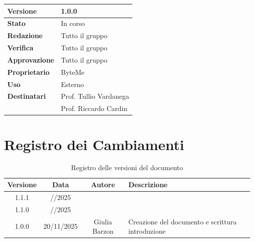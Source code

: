 \documentclass[11pt,a4paper]{article}
\begin{document}
\begin{titlepage}
    \begin{table}[H]
        \centering
        \begin{tabular}{|l|p{5cm}|}
            \hline
            \textbf{Versione} & 1.0.0 \\
            \hline
            \textbf{Stato} & In corso \\
            \hline
            \textbf{Redazione} & Tutto il gruppo \\
            \hline
            \textbf{Verifica} & Tutto il gruppo \\
            \hline
            \textbf{Approvazione} & Tutto il gruppo \\
            \hline
            \textbf{Proprietario} & ByteMe \\
            \hline
            \textbf{Uso} & Esterno \\
            \hline
            \textbf{Destinatari} & Prof. Tullio Vardanega \\ & Prof. Riccardo Cardin \\
            \hline
        \end{tabular}
    \end{table}
    
    \vfill
\end{titlepage}

\thispagestyle{empty}
\section*{Registro dei Cambiamenti}

\begin{table}[H]
    \centering
    \begin{tabular}{|c|c|c|>{\raggedright\arraybackslash}p{}|}
        \hline
        \textbf{Versione} & \textbf{Data} & \textbf{Autore} & \textbf{Descrizione} \\
        \hline
        1.1.1 & //2025 &  &  \\
        \hline
        1.1.0 & //2025 &  &  \\
        \hline
        1.0.0 & 20/11/2025 & Giulia Barzon & Creazione del documento e scrittura introduzione \\
        \hline
    \end{tabular}
    \caption{Registro delle versioni del documento}
    \label{tab:versionamento}
\end{table}

\newpage
\end{document}
